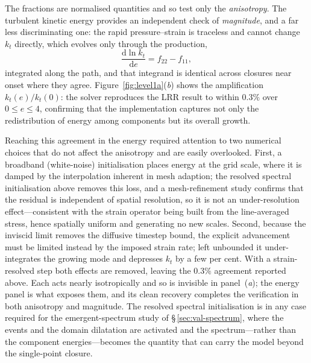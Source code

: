 \documentclass[lineno]{JFM-FLM_Au}
\begin{document}
The fractions are normalised quantities and so test only the
\emph{anisotropy}. The turbulent kinetic energy provides an independent
check of \emph{magnitude}, and a far less discriminating one: the rapid
pressure--strain is traceless and cannot change $k_t$ directly, which
evolves only through the production,
\begin{equation}
  \frac{\mathrm{d}\ln k_t}{\mathrm{d}e} = f_{22} - f_{11},
  \label{eq:dlnkt}
\end{equation}
integrated along the path, and that integrand is identical
across closures near onset where they agree.
Figure~\ref{fig:level1a}(\textit{b}) shows the amplification
$k_t(e)/k_t(0)$: the solver reproduces the LRR result to within $0.3\%$ over
$0\le e\le4$, confirming that the implementation captures not only the
redistribution of energy among components but its overall growth.
 
Reaching this agreement in the energy required attention to two numerical
choices that do not affect the anisotropy and are easily overlooked. First,
a broadband (white-noise) initialisation places energy at the grid scale,
where it is damped by the interpolation inherent in mesh adaption; the
resolved spectral initialisation above removes this loss, and a
mesh-refinement study confirms that the residual is independent of spatial
resolution, so it is not an under-resolution effect---consistent with the
strain operator being built from the line-averaged stress, hence spatially
uniform and generating no new scales. Second, because the inviscid limit
removes the diffusive timestep bound, the explicit advancement must be
limited instead by the imposed strain rate; left unbounded it
under-integrates the growing mode and depresses $k_t$ by a few per cent.
With a strain-resolved step both effects are removed, leaving the $0.3\%$
agreement reported above. Each acts nearly isotropically and so is invisible
in panel~(\textit{a}); the energy panel is what exposes them, and its clean
recovery completes the verification in both anisotropy and magnitude. The
resolved spectral initialisation is in any case required for the
emergent-spectrum study of \S\,\ref{sec:val-spectrum}, where the events and
the domain dilatation are activated and the spectrum---rather than the
component energies---becomes the quantity that can carry the model beyond the
single-point closure.
\end{document}
